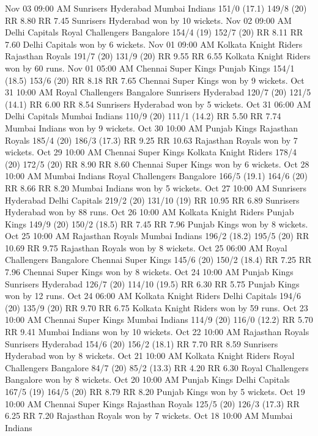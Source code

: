 Nov 03
09:00 AM
Sunrisers Hyderabad
Mumbai Indians
151/0 (17.1)
149/8 (20)
RR 8.80
RR 7.45
Sunrisers Hyderabad won by 10 wickets.
Nov 02
09:00 AM
Delhi Capitals
Royal Challengers Bangalore
154/4 (19)
152/7 (20)
RR 8.11
RR 7.60
Delhi Capitals won by 6 wickets.
Nov 01
09:00 AM
Kolkata Knight Riders
Rajasthan Royals
191/7 (20)
131/9 (20)
RR 9.55
RR 6.55
Kolkata Knight Riders won by 60 runs.
Nov 01
05:00 AM
Chennai Super Kings
Punjab Kings
154/1 (18.5)
153/6 (20)
RR 8.18
RR 7.65
Chennai Super Kings won by 9 wickets.
Oct 31
10:00 AM
Royal Challengers Bangalore
Sunrisers Hyderabad
120/7 (20)
121/5 (14.1)
RR 6.00
RR 8.54
Sunrisers Hyderabad won by 5 wickets.
Oct 31
06:00 AM
Delhi Capitals
Mumbai Indians
110/9 (20)
111/1 (14.2)
RR 5.50
RR 7.74
Mumbai Indians won by 9 wickets.
Oct 30
10:00 AM
Punjab Kings
Rajasthan Royals
185/4 (20)
186/3 (17.3)
RR 9.25
RR 10.63
Rajasthan Royals won by 7 wickets.
Oct 29
10:00 AM
Chennai Super Kings
Kolkata Knight Riders
178/4 (20)
172/5 (20)
RR 8.90
RR 8.60
Chennai Super Kings won by 6 wickets.
Oct 28
10:00 AM
Mumbai Indians
Royal Challengers Bangalore
166/5 (19.1)
164/6 (20)
RR 8.66
RR 8.20
Mumbai Indians won by 5 wickets.
Oct 27
10:00 AM
Sunrisers Hyderabad
Delhi Capitals
219/2 (20)
131/10 (19)
RR 10.95
RR 6.89
Sunrisers Hyderabad won by 88 runs.
Oct 26
10:00 AM
Kolkata Knight Riders
Punjab Kings
149/9 (20)
150/2 (18.5)
RR 7.45
RR 7.96
Punjab Kings won by 8 wickets.
Oct 25
10:00 AM
Rajasthan Royals
Mumbai Indians
196/2 (18.2)
195/5 (20)
RR 10.69
RR 9.75
Rajasthan Royals won by 8 wickets.
Oct 25
06:00 AM
Royal Challengers Bangalore
Chennai Super Kings
145/6 (20)
150/2 (18.4)
RR 7.25
RR 7.96
Chennai Super Kings won by 8 wickets.
Oct 24
10:00 AM
Punjab Kings
Sunrisers Hyderabad
126/7 (20)
114/10 (19.5)
RR 6.30
RR 5.75
Punjab Kings won by 12 runs.
Oct 24
06:00 AM
Kolkata Knight Riders
Delhi Capitals
194/6 (20)
135/9 (20)
RR 9.70
RR 6.75
Kolkata Knight Riders won by 59 runs.
Oct 23
10:00 AM
Chennai Super Kings
Mumbai Indians
114/9 (20)
116/0 (12.2)
RR 5.70
RR 9.41
Mumbai Indians won by 10 wickets.
Oct 22
10:00 AM
Rajasthan Royals
Sunrisers Hyderabad
154/6 (20)
156/2 (18.1)
RR 7.70
RR 8.59
Sunrisers Hyderabad won by 8 wickets.
Oct 21
10:00 AM
Kolkata Knight Riders
Royal Challengers Bangalore
84/7 (20)
85/2 (13.3)
RR 4.20
RR 6.30
Royal Challengers Bangalore won by 8 wickets.
Oct 20
10:00 AM
Punjab Kings
Delhi Capitals
167/5 (19)
164/5 (20)
RR 8.79
RR 8.20
Punjab Kings won by 5 wickets.
Oct 19
10:00 AM
Chennai Super Kings
Rajasthan Royals
125/5 (20)
126/3 (17.3)
RR 6.25
RR 7.20
Rajasthan Royals won by 7 wickets.
Oct 18
10:00 AM
Mumbai Indians
